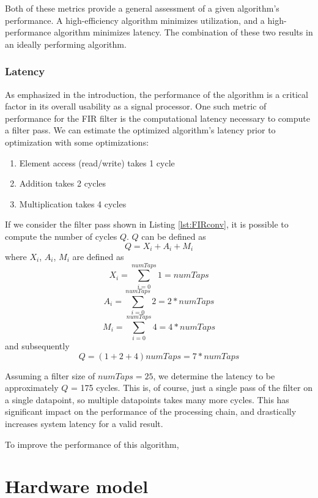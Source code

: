 \documentclass[11pt]{report}
\begin{document}
Both of these metrics provide a general assessment of a given algorithm's performance. A high-efficiency algorithm minimizes utilization, and a high-performance algorithm minimizes latency. The combination of these two results in an ideally performing algorithm.

\subsubsection{Latency}
As emphasized in the introduction, the performance of the algorithm is a critical factor in its overall usability as a signal processor. One such metric of performance for the FIR filter is the computational latency necessary to compute a filter pass. We can estimate the optimized algorithm's latency prior to optimization with some optimizations:
\begin{enumerate}
	\item Element access (read/write) takes 1 cycle
	\item Addition takes 2 cycles
	\item Multiplication takes 4 cycles
\end{enumerate}
If we consider the filter pass shown in Listing \ref{lst:FIRconv}, it is possible to compute the number of cycles $Q$. $Q$ can be defined as 
\begin{equation}
	Q = X_i + A_i + M_i
\end{equation}
where $X_i$, $A_i$, $M_i$ are defined as 
\begin{equation}
	X_i = \sum_{i=0}^{numTaps} 1 = numTaps
\end{equation}
\begin{equation}
	A_i = \sum_{i=0}^{numTaps} 2 = 2 * numTaps
\end{equation}
\begin{equation}
	M_i = \sum_{i=0}^{numTaps} 4 = 4 * numTaps
\end{equation}
and subsequently 
\begin{equation}
	Q = (1 + 2 + 4)numTaps = 7 * numTaps
\end{equation}
 
 Assuming a filter size of $numTaps = 25$, we determine the latency to be approximately $Q$ = 175 cycles. This is, of course, just a single pass of the filter on a single datapoint, so multiple datapoints takes many more cycles. This has significant impact on the performance of the processing chain, and drastically increases system latency for a valid result. 
 
 To improve the performance of this algorithm, 










\section{Hardware model}
\end{document}
